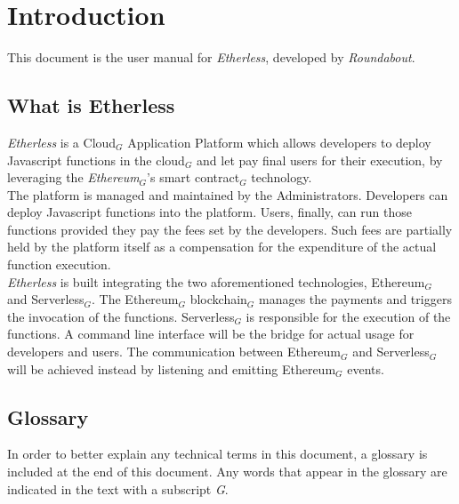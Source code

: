 \section{Introduction}
This document is the user manual for \textit{Etherless}, developed by \textit{Roundabout}.
\subsection{What is Etherless}
\textit{Etherless} is a Cloud$_{G}$ Application Platform which allows developers to deploy Javascript functions in the cloud$_{G}$ and let pay final users for their execution, by leveraging the \textit{Ethereum$_{G}$}'s smart contract$_{G}$ technology.\\
The platform is managed and maintained by the Administrators.
Developers can deploy Javascript functions into the platform. Users, finally, can run those functions provided they pay the fees set by the developers. Such fees are partially held by the platform itself as a compensation for the expenditure of the actual function execution.\\
\textit{Etherless} is built integrating the two aforementioned technologies, Ethereum$_{G}$ and Serverless$_{G}$. The Ethereum$_{G}$ blockchain$_{G}$ manages the payments and triggers the invocation of the functions. Serverless$_{G}$ is responsible for the execution of the functions. A command line interface will be the bridge for actual usage for developers and users. The communication between Ethereum$_{G}$ and Serverless$_{G}$ will be achieved instead by listening and emitting Ethereum$_{G}$ events.

\subsection{Glossary}
In order to better explain any technical terms in this document, a glossary is included at the end of this document. Any words that appear in the glossary are indicated in the text with a subscript \textit{G}.
